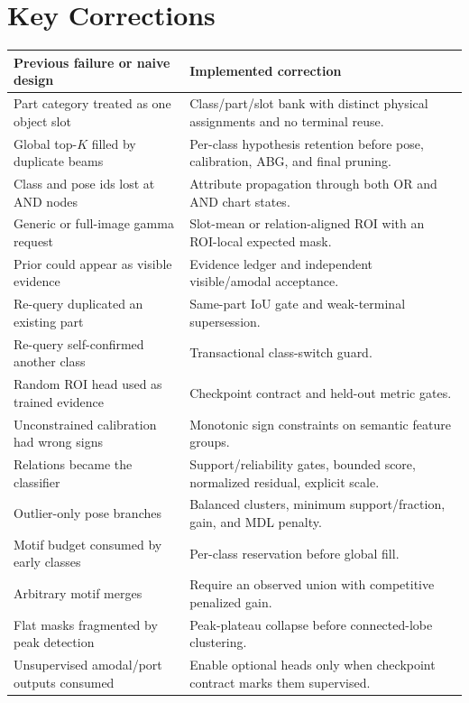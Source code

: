 \documentclass[11pt]{article}
\begin{document}
\section{Key Corrections}

\begin{longtable}{p{}p{}}
\toprule
Previous failure or naive design & Implemented correction \\
\midrule
\endhead
Part category treated as one object slot & Class/part/slot bank with distinct physical assignments and no terminal reuse. \\
Global top-$K$ filled by duplicate beams & Per-class hypothesis retention before pose, calibration, ABG, and final pruning. \\
Class and pose ids lost at AND nodes & Attribute propagation through both OR and AND chart states. \\
Generic or full-image gamma request & Slot-mean or relation-aligned ROI with an ROI-local expected mask. \\
Prior could appear as visible evidence & Evidence ledger and independent visible/amodal acceptance. \\
Re-query duplicated an existing part & Same-part IoU gate and weak-terminal supersession. \\
Re-query self-confirmed another class & Transactional class-switch guard. \\
Random ROI head used as trained evidence & Checkpoint contract and held-out metric gates. \\
Unconstrained calibration had wrong signs & Monotonic sign constraints on semantic feature groups. \\
Relations became the classifier & Support/reliability gates, bounded score, normalized residual, explicit scale. \\
Outlier-only pose branches & Balanced clusters, minimum support/fraction, gain, and MDL penalty. \\
Motif budget consumed by early classes & Per-class reservation before global fill. \\
Arbitrary motif merges & Require an observed union with competitive penalized gain. \\
Flat masks fragmented by peak detection & Peak-plateau collapse before connected-lobe clustering. \\
Unsupervised amodal/port outputs consumed & Enable optional heads only when checkpoint contract marks them supervised. \\
\bottomrule
\end{longtable}
\end{document}
